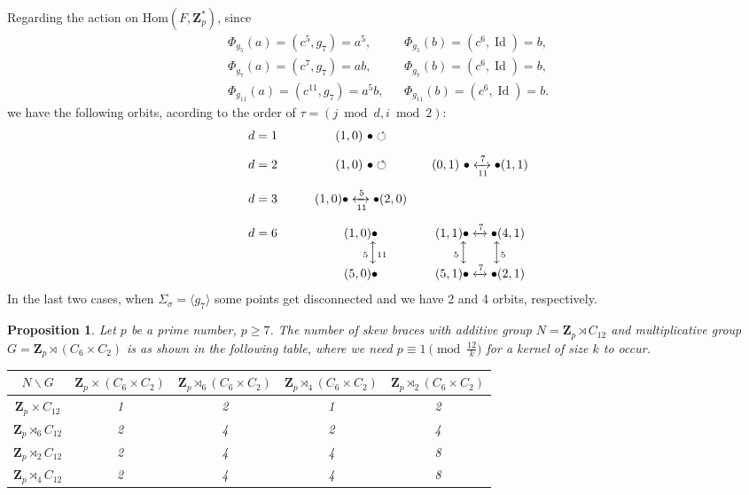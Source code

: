 \documentclass[12pt]{article}
\newtheorem{proposition}[theorem]{Proposition}
\theoremstyle{definition}
\newcommand{\Z}{\mathbf Z}
\newcommand{\Hom}{\mathrm{Hom}}
\newcommand{\Id}{\operatorname{Id}}
\begin{document}
Regarding the action on  $\Hom(F,\Z_p^*)$, since
$$\begin{array}{lcl}\Phi_{g_5}(a)=(c^5,g_7)=a^5, & & \Phi_{g_5}(b)=(c^6,\Id)=b, \\[0.5ex]
\Phi_{g_7}(a)=(c^7,g_7)=ab, && \Phi_{g_7}(b)=(c^6,\Id)=b, \\[0.5ex]
\Phi_{g_{11}}(a)=(c^{11},g_7)=a^5b, && \Phi_{g_{11}}(b)=(c^6,\Id)=b. \end{array}
$$
we have the following orbits, acording to the order of $\tau=(j\bmod d ,i\bmod 2)$:
$$
\begin{array}{lccccc}
d=1 &&& (1,0)\ \bullet \circlearrowleft &&\\[2ex]
d=2 && & (1,0)\ \bullet \circlearrowleft  &&(0,1)\ \bullet \xleftrightarrow[11]{7}\bullet (1,1)\\[3ex]
d=3 &&&  (1,0)\bullet \xleftrightarrow[11]{5}\bullet (2,0)&&\\[3ex]
d=6 &&& (1,0)\bullet  &&  (1,1)\bullet \xleftrightarrow{7} \bullet (4,1)\\
&& &\ \qquad {_{5}}\Big\updownarrow {_{11}}&&{_{5}}\Big\updownarrow\quad \quad \Big\updownarrow {_{5}}\\
&&&  (5,0)\bullet && (5,1)\bullet \xleftrightarrow{7} \bullet (2,1)\\
\end{array}
$$
In the last two cases, when $\Sigma_{\sigma}=\langle g_7\rangle$ some points get disconnected and we have 2 and 4 orbits, respectively.

\begin{proposition}
	Let $p$ be a prime number, $p\geq 7$. The number of skew braces with additive group $N=\Z_p \rtimes C_{12}$ and multiplicative group $G=\Z_p\rtimes (C_6\times C_2)$ is as shown in the following table, where  we need $p\equiv 1 \pmod{\frac {12}k}$ for a kernel of size $k$ to occur.
	
	\begin{center}
		\begin{tabular}{|c||c|c|c|c|}
			\hline
			$N \backslash G$ & $\Z_p\times (C_6\times C_2)$ & $\Z_p\rtimes_{6} (C_6\times C_2)$ & $\Z_p\rtimes_{4} (C_6\times C_2)$ & $\Z_p\rtimes_{2} (C_6\times C_2)$ \\
			\hline
			\hline
			$\Z_p \times C_{12}$ &1&2&1&2\\
			\hline
			$\Z_p \rtimes_{6} C_{12}$ &2&4&2&4\\
			\hline
			$\Z_p \rtimes_{2} C_{12}$ &2&4&4&8\\
			\hline
			$\Z_p \rtimes_{4} C_{12}$ &2&4&4&8\\
			
			\hline
		\end{tabular}
	\end{center}
\end{proposition}
\end{document}
